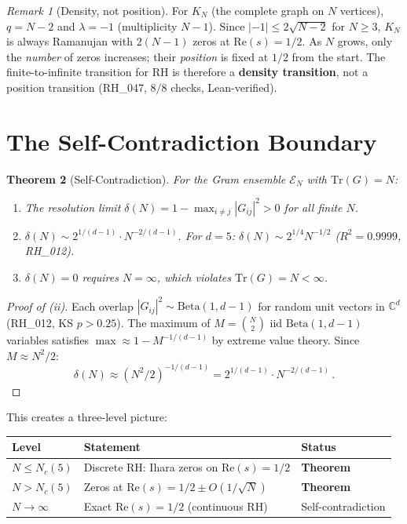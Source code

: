\documentclass[12pt]{article}
\newtheorem{theorem}{Theorem}[section]
\theoremstyle{definition}
\theoremstyle{remark}
\newtheorem{remark}[theorem]{Remark}
\newcommand{\CC}{\mathbb{C}}
\newcommand{\Tr}{\mathrm{Tr}}
\begin{document}
\begin{remark}[Density, not position]
For $K_N$ (the complete graph on $N$ vertices),
$q = N-2$ and $\lambda = -1$ (multiplicity $N-1$).
Since $|-1| \leq 2\sqrt{N-2}$ for $N \geq 3$,
$K_N$ is always Ramanujan with $2(N-1)$ zeros
at $\mathrm{Re}(s) = 1/2$.
As $N$ grows, only the \emph{number} of zeros increases;
their \emph{position} is fixed at $1/2$ from the start.
The finite-to-infinite transition for RH is therefore
a \textbf{density transition}, not a position transition
(RH\_047, $8/8$ checks, Lean-verified).
\end{remark}

\section{The Self-Contradiction Boundary}
\label{sec:boundary}

\begin{theorem}[Self-Contradiction]\label{thm:sc}
For the Gram ensemble $\mathcal{E}_N$ with $\Tr(G) = N$:
\begin{enumerate}[label=(\roman*)]
\item The resolution limit
  $\delta(N) = 1 - \max_{i \neq j} |G_{ij}|^2 > 0$
  for all finite $N$.
\item $\delta(N) \sim 2^{1/(d-1)} \cdot N^{-2/(d-1)}$.
  For $d = 5$: $\delta(N) \sim 2^{1/4} N^{-1/2}$
  ($R^2 = 0.9999$, RH\_012).
\item $\delta(N) = 0$ requires $N = \infty$, which violates
  $\Tr(G) = N < \infty$.
\end{enumerate}
\end{theorem}

\begin{proof}[Proof of (ii)]
Each overlap $|G_{ij}|^2 \sim \mathrm{Beta}(1, d{-}1)$ for
random unit vectors in $\CC^d$ (RH\_012, KS $p > 0.25$).
The maximum of $M = \binom{N}{2}$ iid $\mathrm{Beta}(1,d{-}1)$
variables satisfies $\max \approx 1 - M^{-1/(d-1)}$ by
extreme value theory.
Since $M \approx N^2/2$:
$$\delta(N) \approx (N^2/2)^{-1/(d-1)} = 2^{1/(d-1)} \cdot N^{-2/(d-1)}\,.$$
\end{proof}

This creates a three-level picture:

\begin{center}
\begin{tabular}{lll}
\toprule
Level & Statement & Status \\
\midrule
$N \leq N_c(5)$ & Discrete RH: Ihara zeros on
  $\mathrm{Re}(s) = 1/2$ & \textbf{Theorem} \\
$N > N_c(5)$ & Zeros at $\mathrm{Re}(s) = 1/2 \pm O(1/\sqrt{N})$
  & \textbf{Theorem} \\
$N \to \infty$ & Exact $\mathrm{Re}(s) = 1/2$ (continuous RH)
  & Self-contradiction \\
\bottomrule
\end{tabular}
\end{center}
\end{document}
